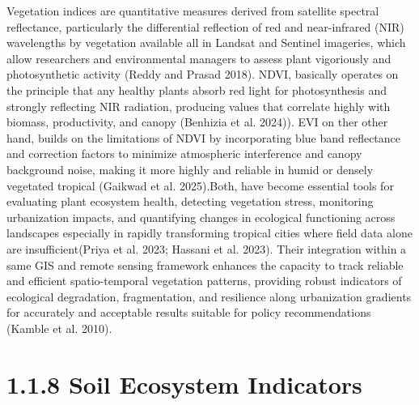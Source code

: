 Vegetation indices are quantitative measures derived from satellite spectral reflectance, particularly the differential reflection of red and near-infrared (NIR) wavelengths by vegetation available all in Landsat and Sentinel imageries, which allow researchers and environmental managers to assess plant vigoriously and photosynthetic activity (Reddy and Prasad 2018). NDVI, basically operates on the principle that any healthy plants absorb red light for photosynthesis and strongly reflecting NIR radiation, producing values that correlate highly with biomass, productivity, and canopy (Benhizia et al. 2024)). EVI on ther other hand, builds on the limitations of NDVI by incorporating blue band reflectance and correction factors to minimize atmospheric interference and canopy background noise, making it more highly and reliable in humid or densely vegetated tropical (Gaikwad et al. 2025).Both, have become essential tools for evaluating plant ecosystem health, detecting vegetation stress, monitoring urbanization impacts, and quantifying changes in ecological functioning across landscapes especially in rapidly transforming tropical cities where field data alone are insufficient(Priya et al. 2023; Hassani et al. 2023). Their integration within a same GIS and remote sensing framework enhances the capacity to track reliable and efficient spatio-temporal vegetation patterns, providing robust indicators of ecological degradation, fragmentation, and resilience along urbanization gradients for accurately and acceptable results suitable for policy recommendations (Kamble et al. 2010).
\hypertarget{soil-ecosystem-indicators}{%
\section{\texorpdfstring{\textbf{1.1.8 Soil Ecosystem Indicators}}{1.1.8 Soil Ecosystem Indicators}}\label{soil-ecosystem-indicators}}

